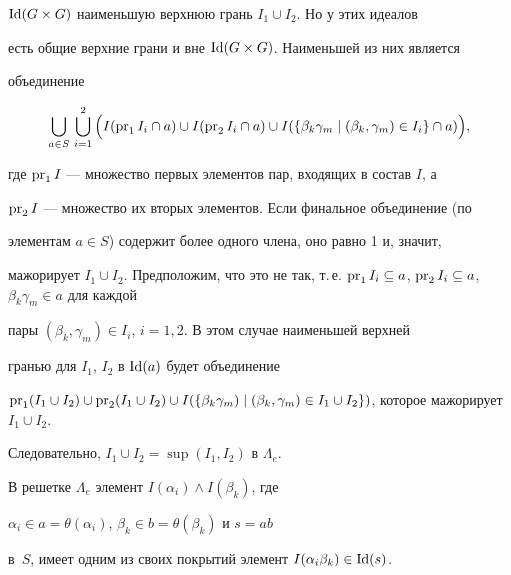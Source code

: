 $\operatorname{Id}(G\times G)$ наименьшую верхнюю грань $I_1\cup I_2$. Но у этих идеалов


есть общие верхние грани и вне $\operatorname{Id}(G\times G)$. Наименьшей из них является


объединение


$$


\bigcup_{a\in S}\,\bigcup_{i=1}^2\Big(I(\pr_1 I_i\cap a)\cup I(\pr_2 I_i\cap


a)\cup I(\{\beta_k\gamma_m\mid (\beta_k,\gamma_m)\in I_i\}\cap


a)\Big),


$$


где $\operatorname{pr}_1 I$ --- множество первых элементов пар, входящих в состав $I$, а


$\operatorname{pr}_2 I$ --- множество их вторых элементов. Если финальное объединение (по


элементам $a\in S$) содержит более одного члена, оно равно 1 и, значит,


мажорирует $I_1\cup I_2$. Предположим, что это не так, т.\,е. $\pr_1


I_i\subseteq a$, $\pr_2 I_i\subseteq a$, $\beta_k\gamma_m\in a$ для каждой


пары $(\beta_k,\gamma_m)\in I_i$, $i=1,2$. В этом случае наименьшей верхней


гранью для $I_1$, $I_2$ в $\operatorname{Id}(a)$ будет объединение


$\pr_1(I_1\cup I_2)\cup


\pr_2(I_1\cup I_2)\cup I(\{\beta_k\gamma_m)\mid


(\beta_k,\gamma_m)\in I_1\cup I_2\})$, которое мажорирует $I_1\cup I_2$.


Следовательно, $I_1\cup I_2=\sup(I_1, I_2)$ в $\Lambda_e$.





\begin{lem}


В решетке $\Lambda_e$ элемент $I(\alpha_i)\wedge I(\beta_k)$, где


$\alpha_i\in a=\theta(\alpha_i)$, $\beta_k\in b=\theta(\beta_k)$ и $s=ab$


в~$S$, имеет одним из своих покрытий элемент $I(\alpha_i\beta_k)\in \operatorname{Id}(s)$.


\end{lem}





